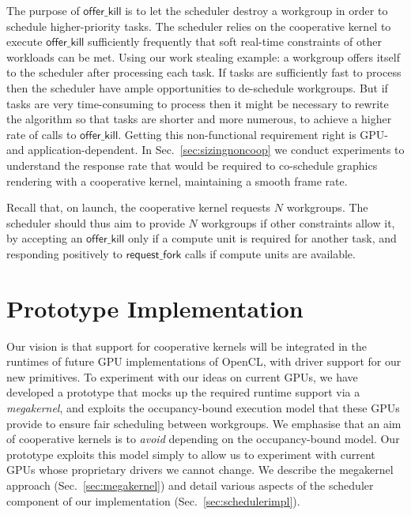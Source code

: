 \documentclass[sigconf]{acmart}
\makeatletter
\renewcommand\paragraph{\@startsection{paragraph}{4}{\z@}%
  {-.5\baselineskip \@plus -2\p@ \@minus -.2\p@}%
  {-3.5\p@}%
  {\bfseries\@parfont}}
\newcommand{\mysec}{Sec.~}
\newcommand{\offerfork}{\mathsf{request\_fork}}
\newcommand{\offerkill}{\mathsf{offer\_kill}}
\makeatother
\begin{document}
{The purpose of $\offerkill$ is to let the scheduler destroy a workgroup
in order to schedule higher-priority tasks.  The scheduler relies on the
cooperative kernel to execute $\offerkill$ sufficiently frequently that
soft real-time constraints of other workloads can be met.
%
Using our work stealing example: a workgroup offers itself to
the scheduler after processing each task.  If tasks are sufficiently
fast to process then the scheduler have ample opportunities to
de-schedule workgroups.  But if tasks are very time-consuming to
process then it might be necessary to rewrite the algorithm so that
tasks are shorter and more numerous, to achieve a higher rate of calls
to $\offerkill$.
%
Getting this non-functional requirement right is GPU- and
application-dependent.  In \mysec\ref{sec:sizingnoncoop} we conduct
experiments to understand the response rate that would be required to
co-schedule graphics rendering with a cooperative kernel, maintaining
a smooth frame rate.


Recall that, on launch, the cooperative kernel requests $N$ workgroups.
The scheduler should thus aim to provide $N$ workgroups if other constraints allow it,
by accepting an $\offerkill$ only if a compute unit is required for another
task, and responding positively to $\offerfork$ calls if compute units are available.





\section{Prototype Implementation}\label{sec:implementation}

Our vision is that support for cooperative kernels will be integrated
in the runtimes of future GPU implementations of OpenCL, with driver
support for our new primitives.  To experiment with our ideas on
current GPUs, we have developed a prototype that mocks up the required
runtime support via a \emph{megakernel}, and exploits the
occupancy-bound execution model that these GPUs provide to ensure fair
scheduling between workgroups.  We emphasise that an aim of
cooperative kernels is to \emph{avoid} depending on the
occupancy-bound model.  Our prototype exploits this model simply to
allow us to experiment with current GPUs whose proprietary drivers we
cannot change.  We describe the megakernel approach
(\mysec\ref{sec:megakernel}) and detail various aspects of the
scheduler component of our implementation
(\mysec\ref{sec:schedulerimpl}).

}
\end{document}
